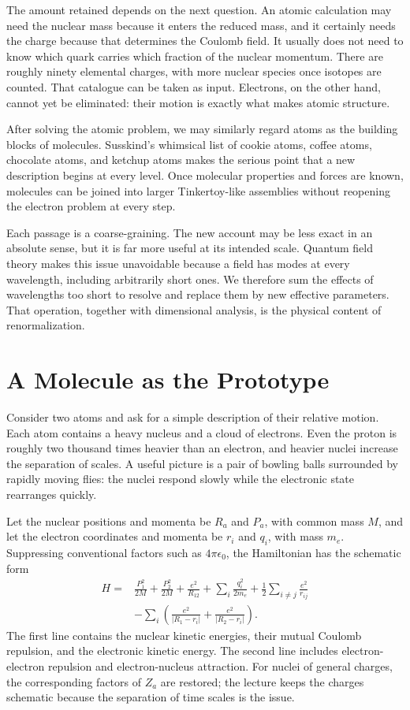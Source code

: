 The amount retained depends on the next question. An atomic calculation may
need the nuclear mass because it enters the reduced mass, and it certainly
needs the charge because that determines the Coulomb field. It usually does
not need to know which quark carries which fraction of the nuclear momentum.
There are roughly ninety elemental charges, with more nuclear species once
isotopes are counted. That catalogue can be taken as input. Electrons, on the
other hand, cannot yet be eliminated: their motion is exactly what makes
atomic structure.

After solving the atomic problem, we may similarly regard atoms as the
building blocks of molecules. Susskind's whimsical list of cookie atoms,
coffee atoms, chocolate atoms, and ketchup atoms makes the serious point that
a new description begins at every level. Once molecular properties and
forces are known, molecules can be joined into larger Tinkertoy-like
assemblies without reopening the electron problem at every step.

Each passage is a coarse-graining. The new account may be less exact in an
absolute sense, but it is far more useful at its intended scale. Quantum field
theory makes this issue unavoidable because a field has modes at every
wavelength, including arbitrarily short ones. We therefore sum the effects of
wavelengths too short to resolve and replace them by new effective parameters.
That operation, together with dimensional analysis, is the physical content
of renormalization.

\section{A Molecule as the Prototype}

Consider two atoms and ask for a simple description of their relative
motion. Each atom contains a heavy nucleus and a
cloud of electrons. Even the proton is roughly two thousand times heavier
than an electron, and heavier nuclei increase the separation of scales. A
useful picture is a pair of bowling balls surrounded by rapidly moving flies:
the nuclei respond slowly while the electronic state rearranges quickly.

Let the nuclear positions and momenta be \(R_a\) and \(P_a\), with common
mass \(M\), and let the electron coordinates and momenta be \(r_i\) and
\(q_i\), with mass \(m_e\). Suppressing conventional factors such as
\(4\pi\epsilon_0\), the Hamiltonian has the schematic form
\begin{align}
H={}&
\frac{P_1^2}{2M}+\frac{P_2^2}{2M}
+\frac{e^2}{R_{12}}
+\sum_i\frac{q_i^2}{2m_e}
+\frac12\sum_{i\ne j}\frac{e^2}{r_{ij}}
\nonumber\\
&-\sum_i\left(
\frac{e^2}{|R_1-r_i|}
+\frac{e^2}{|R_2-r_i|}
\right).
\label{eq:molecular-hamiltonian}
\end{align}
The first line contains the nuclear kinetic energies, their mutual Coulomb
repulsion, and the electronic kinetic energy. The second line includes
electron-electron repulsion and electron-nucleus attraction. For nuclei of
general charges, the corresponding factors of \(Z_a\) are restored; the
lecture keeps the charges schematic because the separation of time scales is
the issue.

